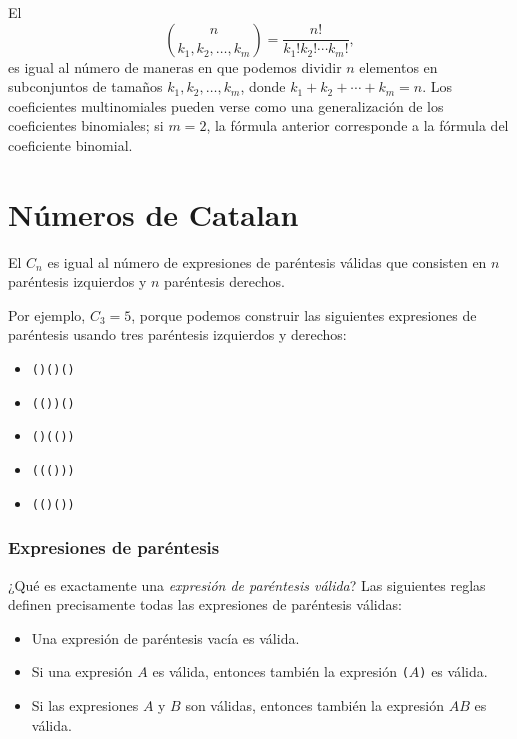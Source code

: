 
El 
\[ {n \choose k_1,k_2,\ldots,k_m} = \frac{n!}{k_1! k_2! \cdots k_m!}, \]
es igual al número de maneras
en que podemos dividir $n$ elementos en subconjuntos
de tamaños $k_1,k_2,\ldots,k_m$,
donde $k_1+k_2+\cdots+k_m=n$.
Los coeficientes multinomiales pueden verse como una
generalización de los coeficientes binomiales;
si $m=2$, la fórmula anterior
corresponde a la fórmula del coeficiente binomial.

\section{Números de Catalan}


El 
$C_n$ es igual al
número de expresiones de paréntesis válidas que consisten en
$n$ paréntesis izquierdos y $n$ paréntesis derechos.

Por ejemplo, $C_3=5$, porque
podemos construir las siguientes expresiones de paréntesis
usando tres
paréntesis izquierdos y derechos:



\begin{itemize}[noitemsep]
\item \texttt{()()()}
\item \texttt{(())()}
\item \texttt{()(())}
\item \texttt{((()))}
\item \texttt{(()())}
\end{itemize}

\subsubsection{Expresiones de paréntesis}


¿Qué es exactamente una \emph{expresión de paréntesis válida}?
Las siguientes reglas definen precisamente todas
las expresiones de paréntesis válidas:

\begin{itemize}
\item Una expresión de paréntesis vacía es válida.
\item Si una expresión $A$ es válida,
entonces también la expresión
\texttt{(}$A$\texttt{)} es válida.
\item Si las expresiones $A$ y $B$ son válidas,
entonces también la expresión $AB$ es válida.
\end{itemize}

